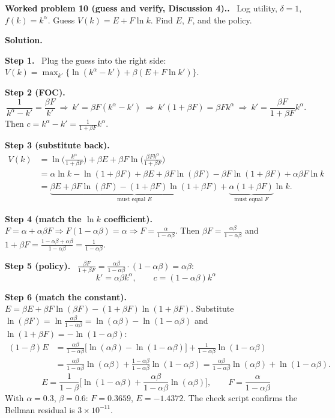 \documentclass[12pt]{article}
\newcommand{\st}[1]{\par\smallskip\textbf{Step #1.}\ }
\newcommand{\ans}[1]{\[\boxed{\ #1\ }\]}
\newcommand{\prob}[1]{\par\bigskip\textbf{Worked problem #1.}\ }
\newcommand{\sol}{\par\smallskip\textbf{Solution.}\par}
\begin{document}
\prob{10 (guess and verify, Discussion 4).} Log utility, $\delta=1$, $f(k)=k^\alpha$. Guess $V(k)=E+F\ln k$. Find $E$, $F$, and the policy.
\sol
\st{1} Plug the guess into the right side: $V(k)=\max_{k'}\{\ln(k^\alpha-k')+\beta(E+F\ln k')\}$.
\st{2 (FOC)}
\[
\frac{1}{k^\alpha-k'}=\frac{\beta F}{k'}\ \Longrightarrow\ k'=\beta F(k^\alpha-k')\ \Longrightarrow\ k'(1+\beta F)=\beta Fk^\alpha\ \Longrightarrow\ k'=\frac{\beta F}{1+\beta F}k^\alpha .
\]
Then $c=k^\alpha-k'=\frac{1}{1+\beta F}k^\alpha$.
\st{3 (substitute back)}
\begin{align*}
V(k)&=\ln\Big(\frac{k^\alpha}{1+\beta F}\Big)+\beta E+\beta F\ln\Big(\frac{\beta Fk^\alpha}{1+\beta F}\Big)\\
&=\alpha\ln k-\ln(1+\beta F)+\beta E+\beta F\ln(\beta F)-\beta F\ln(1+\beta F)+\alpha\beta F\ln k\\
&=\underbrace{\beta E+\beta F\ln(\beta F)-(1+\beta F)\ln(1+\beta F)}_{\text{must equal }E}+\underbrace{\alpha(1+\beta F)}_{\text{must equal }F}\ln k .
\end{align*}
\st{4 (match the $\ln k$ coefficient)} $F=\alpha+\alpha\beta F\Rightarrow F(1-\alpha\beta)=\alpha\Rightarrow F=\frac{\alpha}{1-\alpha\beta}$.
Then $\beta F=\frac{\alpha\beta}{1-\alpha\beta}$ and $1+\beta F=\frac{1-\alpha\beta+\alpha\beta}{1-\alpha\beta}=\frac{1}{1-\alpha\beta}$.
\st{5 (policy)} $\frac{\beta F}{1+\beta F}=\frac{\alpha\beta}{1-\alpha\beta}\cdot(1-\alpha\beta)=\alpha\beta$:
\ans{k'=\alpha\beta k^\alpha,\qquad c=(1-\alpha\beta)k^\alpha}
\st{6 (match the constant)} $E=\beta E+\beta F\ln(\beta F)-(1+\beta F)\ln(1+\beta F)$. Substitute
$\ln(\beta F)=\ln\frac{\alpha\beta}{1-\alpha\beta}=\ln(\alpha\beta)-\ln(1-\alpha\beta)$ and
$\ln(1+\beta F)=-\ln(1-\alpha\beta)$:
\begin{align*}
(1-\beta)E&=\frac{\alpha\beta}{1-\alpha\beta}\big[\ln(\alpha\beta)-\ln(1-\alpha\beta)\big]+\frac{1}{1-\alpha\beta}\ln(1-\alpha\beta)\\
&=\frac{\alpha\beta}{1-\alpha\beta}\ln(\alpha\beta)+\frac{1-\alpha\beta}{1-\alpha\beta}\ln(1-\alpha\beta)
=\frac{\alpha\beta}{1-\alpha\beta}\ln(\alpha\beta)+\ln(1-\alpha\beta).
\end{align*}
\ans{E=\frac{1}{1-\beta}\Big[\ln(1-\alpha\beta)+\frac{\alpha\beta}{1-\alpha\beta}\ln(\alpha\beta)\Big],\qquad F=\frac{\alpha}{1-\alpha\beta}}
With $\alpha=0.3$, $\beta=0.6$: $F=0.3659$, $E=-1.4372$. The check script confirms the Bellman residual is $3\times10^{-11}$.
\end{document}
